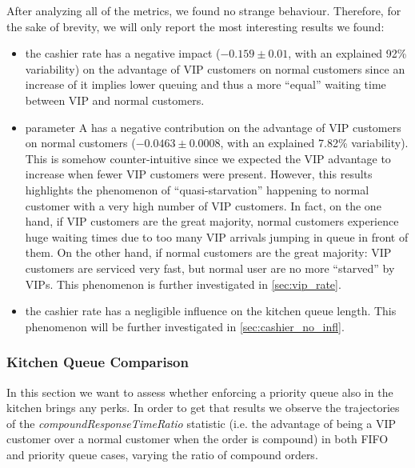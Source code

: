 After analyzing all of the metrics, we found no strange behaviour. Therefore, for the sake of brevity, we will only report the most interesting results we found:
\begin{itemize}
  \item the cashier rate has a negative impact ($-0.159 \pm 0.01$, with an explained 92\% variability) on the advantage of VIP customers 
    on normal customers since an increase of it implies lower queuing and thus 
    a more ``equal'' waiting time between VIP and normal customers.
  \item parameter A has a negative contribution on the advantage of VIP       
    customers on normal customers ($-0.0463 \pm 0.0008$, with an explained 7.82\% variability). This is somehow counter-intuitive since we 
    expected the VIP advantage to increase when fewer VIP customers were present.
    However, this results highlights the phenomenon of ``quasi-starvation''
    happening to normal customer with a very high number of VIP customers. In fact, on the one hand, if VIP customers are the great majority, normal customers experience huge waiting times due to too many VIP arrivals jumping in queue in front of them. On the other hand, if normal customers are the great majority: VIP customers are serviced very fast, but normal user are no more ``starved'' by VIPs. 
    This phenomenon is further investigated in \cref{sec:vip_rate}.
  \item the cashier rate has a negligible influence on the kitchen queue length.  
    This phenomenon will be further investigated in \cref{sec:cashier_no_infl}.
\end{itemize} %

\subsubsection{Kitchen Queue Comparison}

In this section we want to assess whether enforcing a priority queue also in the kitchen brings any perks. In order to get that results we observe the trajectories of the \emph{compoundResponseTimeRatio} statistic (i.e. the advantage of being a VIP customer over a normal customer when the order is compound) in both FIFO and priority queue cases, varying the ratio of compound orders.

